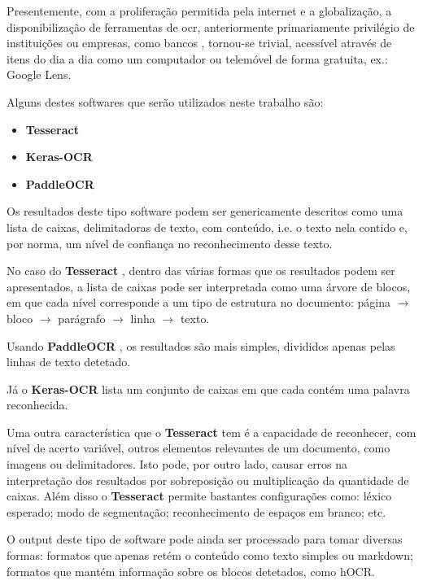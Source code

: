 Presentemente, com a proliferação permitida pela internet e a globalização, a disponibilização de ferramentas de \acrshort{ocr}, anteriormente primariamente privilégio de instituições ou empresas, como bancos \citep{10.5555/1074100.1074664}, tornou-se trivial, acessível através de itens do dia a dia como um computador ou telemóvel de forma gratuita, ex.: Google Lens.

Alguns destes softwares que serão utilizados neste trabalho são:
\begin{itemize}
    \item \textbf{Tesseract} 
    \item \textbf{Keras-OCR}
    \item \textbf{PaddleOCR}
\end{itemize}

Os resultados deste tipo software podem ser genericamente descritos como uma lista de caixas, delimitadoras de texto, com conteúdo, i.e. o texto nela contido e, por norma, um nível de confiança no reconhecimento desse texto.

No caso do \textbf{Tesseract} \citep{tesseract_doc}, dentro das várias formas que os resultados podem ser apresentados, a lista de caixas pode ser interpretada como uma árvore de blocos, em que cada nível corresponde a um tipo de estrutura no documento: página $\longrightarrow$ bloco $\longrightarrow$ parágrafo $\longrightarrow$ linha $\longrightarrow$ texto. 

Usando \textbf{PaddleOCR} \citep{paddle_doc}, os resultados são mais simples, divididos apenas pelas linhas de texto detetado.

Já o \textbf{Keras-OCR} \citep{keras_doc} lista um conjunto de caixas em que cada contém uma palavra reconhecida.

Uma outra característica que o \textbf{Tesseract} tem é a capacidade de reconhecer, com nível de acerto variável, outros elementos relevantes de um documento, como imagens ou delimitadores. Isto pode, por outro lado, causar erros na interpretação dos resultados por sobreposição ou multiplicação da quantidade de caixas.  Além disso o \textbf{Tesseract} permite bastantes configurações como: léxico esperado; modo de segmentação; reconhecimento de espaços em branco; etc.

O output deste tipo de software pode ainda ser processado para tomar diversas formas: formatos que apenas retém o conteúdo como texto simples ou markdown;  formatos que mantém informação sobre os blocos detetados, como hOCR.

